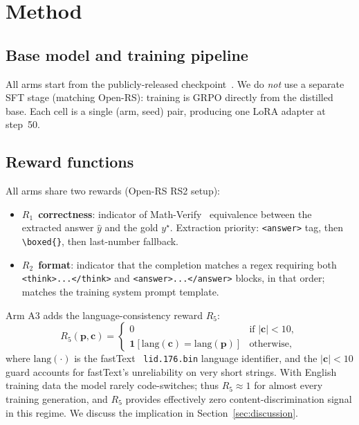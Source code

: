\documentclass[11pt]{article}
\newcommand{\armC}{\textsc{A3}}
\newcommand{\R}[1]{R_{#1}}
\begin{document}
\section{Method}
\label{sec:method}

\subsection{Base model and training pipeline}
All arms start from the publicly-released
checkpoint~\cite{deepseekR1_2025}. We do \emph{not} use a separate SFT
stage (matching Open-RS): training is GRPO directly from the distilled
base. Each cell is a single (arm, seed) pair, producing one LoRA adapter
at step~50.

\subsection{Reward functions}
\label{sec:rewards}
All arms share two rewards (Open-RS RS2 setup):
\begin{itemize}\itemsep0pt
\item $\R{1}$~\textbf{correctness}: indicator of
Math-Verify~\cite{mathverify_2024} equivalence between the extracted
answer $\hat{y}$ and the gold $y^\star$. Extraction priority:
\texttt{<answer>} tag, then \texttt{\textbackslash boxed\{\}}, then
last-number fallback.
\item $\R{2}$~\textbf{format}: indicator that the completion matches a
regex requiring both \texttt{<think>...</think>} and
\texttt{<answer>...</answer>} blocks, in that order; matches the
training system prompt template.
\end{itemize}
Arm \armC{} adds the language-consistency reward $\R{5}$:
\begin{equation}
\R{5}(\mathbf{p},\mathbf{c}) =
\begin{cases}
0 & \text{if } |\mathbf{c}| < 10,\\[2pt]
\mathbf{1}[\mathrm{lang}(\mathbf{c}) {=} \mathrm{lang}(\mathbf{p})]
                & \text{otherwise,}
\end{cases}
\label{eq:r5}
\end{equation}
where $\mathrm{lang}(\cdot)$ is the fastText~\cite{joulin2017fasttext}
\texttt{lid.176.bin} language identifier, and the $|\mathbf{c}|{<}10$
guard accounts for fastText's unreliability on very short strings. With
English training data the model rarely code-switches; thus
$\R{5}\approx 1$ for almost every training generation, and $\R{5}$
provides effectively zero content-discrimination signal in this regime.
We discuss the implication in Section~\ref{sec:discussion}.
\end{document}
